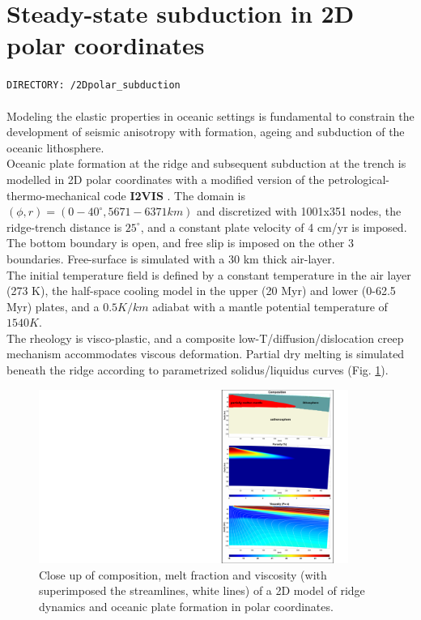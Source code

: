 \vfill %

\section{Steady-state subduction in 2D polar coordinates}
\label{section:cookbook_2Dsubduction}

\texttt{DIRECTORY: /2Dpolar\_subduction}
\\
\\
Modeling the elastic properties in oceanic settings is fundamental to constrain the development of seismic anisotropy with formation, ageing and subduction of the oceanic lithosphere.\\  
Oceanic plate formation at the ridge and subsequent subduction at the trench is modelled in 2D polar coordinates with a modified version of the petrological-thermo-mechanical code \textbf{I2VIS} \citep{gerya2003pepi}. The domain is $(\phi,r)=(0-40^{\circ},5671-6371 km)$ and discretized with 1001x351 nodes, the ridge-trench distance is $25^{\circ}$, and a constant plate velocity of 4 cm/yr is imposed. 
The bottom boundary is open, and free slip is imposed on the other 3 boundaries. Free-surface is simulated with a 30 km thick air-layer.\\
The initial temperature field is defined by a constant temperature in the air layer (273 K), the half-space cooling model in the upper (20 Myr) and lower (0-62.5 Myr) plates, and a $0.5 K/km$ adiabat with a mantle potential temperature of $1540 K$.\\ 
The rheology is visco-plastic, and a composite low-T/diffusion/dislocation creep mechanism accommodates viscous deformation. Partial dry melting is simulated beneath the ridge according to parametrized solidus/liquidus curves (Fig. \ref{fig:meltviscosity}).\\ 

\begin{figure}
    \centering
    \includegraphics[width=0.9\textwidth]{EXEV/Melt+Viscosity.pdf}
    \caption{Close up of composition, melt fraction and viscosity (with superimposed the streamlines, white lines) of a 2D model of ridge dynamics and oceanic plate formation in polar coordinates.  
    }
    \label{fig:meltviscosity}
\end{figure}

